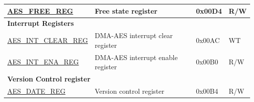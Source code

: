 \begin{longtable}{ | p{6cm} | p{7.2cm} | p{1.3cm} | p{1cm} | }
\hyperref[regdesc:AESFREEREG]{AES\_FREE\_REG} & Free state register & 0x00D4 & R/W \\ \hline
\multicolumn{4}{|l|}{\textbf{Interrupt Registers}} \\ \hline
\hyperref[regdesc:AESINTCLEARREG]{AES\_INT\_CLEAR\_REG} & DMA-AES interrupt clear register  & 0x00AC & WT \\ \hline
\hyperref[regdesc:AESINTENAREG]{AES\_INT\_ENA\_REG} & DMA-AES interrupt enable register	& 0x00B0 & R/W \\ \hline
\multicolumn{4}{|l|}{\textbf{Version Control register}} \\ \hline
\hyperref[regdesc:AESDATEREG]{AES\_DATE\_REG} & Version control register & 0x00B4 & R/W \\ \hline
\end{longtable}
